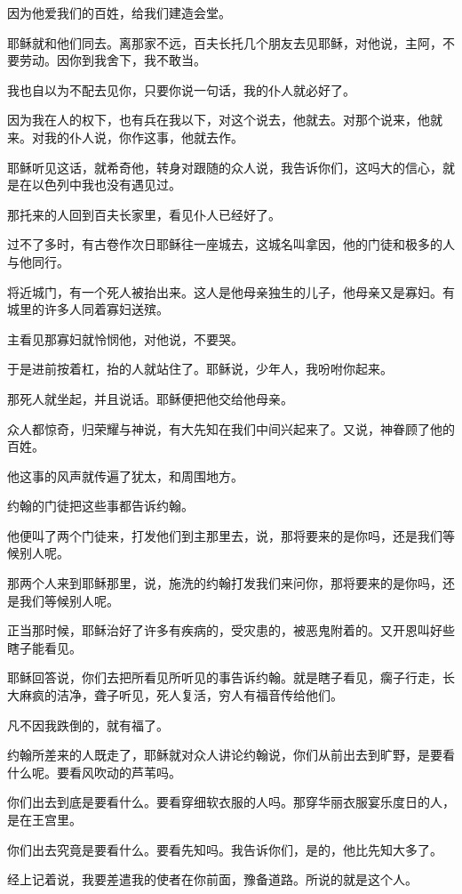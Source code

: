 \documentclass[12pt,oneside]{book}
\begin{document}
因为他爱我们的百姓，给我们建造会堂。

耶稣就和他们同去。离那家不远，百夫长托几个朋友去见耶稣，对他说，主阿，不要劳动。因你到我舍下，我不敢当。

我也自以为不配去见你，只要你说一句话，我的仆人就必好了。

因为我在人的权下，也有兵在我以下，对这个说去，他就去。对那个说来，他就来。对我的仆人说，你作这事，他就去作。

耶稣听见这话，就希奇他，转身对跟随的众人说，我告诉你们，这吗大的信心，就是在以色列中我也没有遇见过。

那托来的人回到百夫长家里，看见仆人已经好了。

过不了多时，有古卷作次日耶稣往一座城去，这城名叫拿因，他的门徒和极多的人与他同行。

将近城门，有一个死人被抬出来。这人是他母亲独生的儿子，他母亲又是寡妇。有城里的许多人同着寡妇送殡。

主看见那寡妇就怜悯他，对他说，不要哭。

于是进前按着杠，抬的人就站住了。耶稣说，少年人，我吩咐你起来。

那死人就坐起，并且说话。耶稣便把他交给他母亲。

众人都惊奇，归荣耀与神说，有大先知在我们中间兴起来了。又说，神眷顾了他的百姓。

他这事的风声就传遍了犹太，和周围地方。

约翰的门徒把这些事都告诉约翰。

他便叫了两个门徒来，打发他们到主那里去，说，那将要来的是你吗，还是我们等候别人呢。

那两个人来到耶稣那里，说，施洗的约翰打发我们来问你，那将要来的是你吗，还是我们等候别人呢。

正当那时候，耶稣治好了许多有疾病的，受灾患的，被恶鬼附着的。又开恩叫好些瞎子能看见。

耶稣回答说，你们去把所看见所听见的事告诉约翰。就是瞎子看见，瘸子行走，长大麻疯的洁净，聋子听见，死人复活，穷人有福音传给他们。

凡不因我跌倒的，就有福了。

约翰所差来的人既走了，耶稣就对众人讲论约翰说，你们从前出去到旷野，是要看什么呢。要看风吹动的芦苇吗。

你们出去到底是要看什么。要看穿细软衣服的人吗。那穿华丽衣服宴乐度日的人，是在王宫里。

你们出去究竟是要看什么。要看先知吗。我告诉你们，是的，他比先知大多了。

经上记着说，我要差遣我的使者在你前面，豫备道路。所说的就是这个人。
\end{document}
